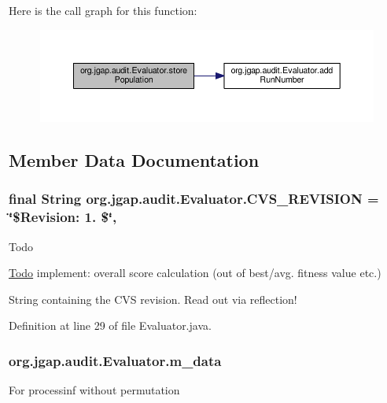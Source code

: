 Here is the call graph for this function\-:
\nopagebreak
\begin{figure}[H]
\begin{center}
\leavevmode
\includegraphics[width=350pt]{classorg_1_1jgap_1_1audit_1_1_evaluator_a48f84bb9929cec12795c98bf1185ac68_cgraph}
\end{center}
\end{figure}




\subsection{Member Data Documentation}
\hypertarget{classorg_1_1jgap_1_1audit_1_1_evaluator_a7a2bf7a73556818006b153c300212453}{
\subsubsection[{C\-V\-S\-\_\-\-R\-E\-V\-I\-S\-I\-O\-N}]{\setlength{\rightskip}{0pt plus 5cm}final String org.\-jgap.\-audit.\-Evaluator.\-C\-V\-S\-\_\-\-R\-E\-V\-I\-S\-I\-O\-N = \char`\"{}\$Revision\-: 1. \$\char`\"{}\hspace{0.3cm}{\ttfamily [static]}, {\ttfamily [private]}}}\label{classorg_1_1jgap_1_1audit_1_1_evaluator_a7a2bf7a73556818006b153c300212453}
\begin{DoxyRefDesc}{Todo}
\item[\hyperlink{todo__todo000028}{Todo}]implement\-: overall score calculation (out of best/avg. fitness value etc.) \end{DoxyRefDesc}
String containing the C\-V\-S revision. Read out via reflection! 

Definition at line 29 of file Evaluator.\-java.

\hypertarget{classorg_1_1jgap_1_1audit_1_1_evaluator_a7e7c140d026509d201e2054509293d88}{
\subsubsection[{m\-\_\-data}]{ org.\-jgap.\-audit.\-Evaluator.\-m\-\_\-data\hspace{0.3cm}{\ttfamily [private]}}}\label{classorg_1_1jgap_1_1audit_1_1_evaluator_a7e7c140d026509d201e2054509293d88}
For processinf without permutation 

